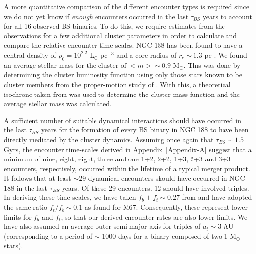 \begin{enumerate}
A more quantitative comparison of the different encounter types is
required since we do not yet know if \textit{enough} encounters
occurred in the last $\tau_{BS}$ years to account for all 16 observed
BS binaries.  To do this, we require estimates from the observations
for a few additional 
cluster parameters in order to calculate and compare the relative
encounter time-scales.  NGC 188 has been found to
have a central density of $\rho_0 = 10^{2.2}$ 
L$_{\odot}$ pc$^{-3}$ \citep{sandquist03} and a core radius of $r_c \sim
1.3$ pc \citep{bonatto05}.  
We found an average stellar mass for the cluster of $<m> \sim 0.9$
M$_{\odot}$.  This was done by determining the cluster luminosity
function using only those stars known to be cluster members from the
proper-motion study of \citet{platais03}.  With this, a theoretical
isochrone taken from \citet{pols98} was used to determine the cluster
mass function and the average stellar mass was calculated.  

A sufficient number of suitable dynamical interactions 
should have occurred in the last $\tau_{BS}$ years for the formation
of every BS binary in NGC 188 to have been directly mediated by the
cluster dynamics.  Assuming once again that $\tau_{BS} \sim 1.5$ Gyrs,
the encounter time-scales derived in Appendix~\ref{Appendix-A} suggest
that a minimum of nine, eight, eight, three and one 1+2, 2+2, 1+3,
2+3 and 3+3 encounters, respectively, 
occurred within the lifetime of a typical merger product.  It follows
that at least $\sim 29$ dynamical encounters
should have occurred in NGC 188 in the last $\tau_{BS}$ years.  Of
these 29 encounters, 12 should have involved triples.  In deriving these time-scales,
we have taken $f_b + f_t \sim 0.27$ from \citet{geller09} and have
adopted the same ratio $f_t/f_b \sim 0.1$ as found for M67.
Consequently, these represent lower 
limits for $f_b$ and $f_t$, so that our derived encounter rates are
also lower limits.  %
We have also assumed an 
average outer semi-major axis for triples of $a_t \sim 3$ AU 
(corresponding to a period of $\sim$ 1000 days for a binary composed
of two 1 M$_{\odot}$ stars).


\end{enumerate}

